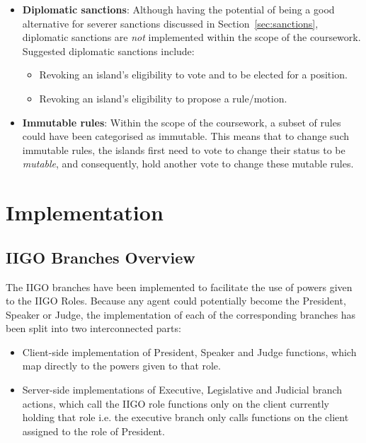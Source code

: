 \begin{itemize}
    \item \textbf{Diplomatic sanctions}: Although having the potential of being a good alternative for severer sanctions discussed in  Section~\ref{sec:sanctions}, diplomatic sanctions are \emph{not} implemented within the scope of the coursework. \\
    Suggested diplomatic sanctions include:
        \begin{itemize}
            \item Revoking an island's eligibility to vote and to be elected for a position.
            \item Revoking an island's eligibility to propose a rule/motion.
        \end{itemize}
    \item \textbf{Immutable rules}: Within the scope of the coursework, a subset of rules could have been categorised as immutable. This means that to change such immutable rules, the islands first need to vote to change their status to be \emph{mutable}, and consequently, hold another vote to change these mutable rules.
\end{itemize}

\section{Implementation} %


\subsection{IIGO Branches Overview}
The IIGO branches have been implemented to facilitate the use of powers given to the IIGO Roles. Because any agent could potentially become the President, Speaker or Judge, the implementation of each of the corresponding branches has been split into two interconnected parts:

\begin{itemize}
\item Client-side implementation of President, Speaker and Judge functions, which map directly to the powers given to that role.
\item Server-side implementations of Executive, Legislative and Judicial branch actions, which call the IIGO role functions only on the client currently holding that role i.e. the executive branch only calls functions on the client assigned to the role of President.
\end{itemize}

